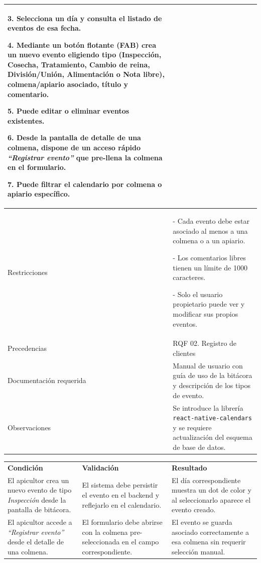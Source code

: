 \begin{tabular}{|p{4.5cm}|p{11cm}|}
3. Selecciona un día y consulta el listado de eventos de esa fecha. \par
4. Mediante un botón flotante (FAB) crea un nuevo evento eligiendo tipo (Inspección, Cosecha, Tratamiento, Cambio de reina, División/Unión, Alimentación o Nota libre), colmena/apiario asociado, título y comentario. \par
5. Puede editar o eliminar eventos existentes. \par
6. Desde la pantalla de detalle de una colmena, dispone de un acceso rápido \textit{``Registrar evento''} que pre-llena la colmena en el formulario. \par
7. Puede filtrar el calendario por colmena o apiario específico. \\
\hline
Restricciones &
- Cada evento debe estar asociado al menos a una colmena o a un apiario. \par
- Los comentarios libres tienen un límite de 1000 caracteres. \par
- Solo el usuario propietario puede ver y modificar sus propios eventos. \\
\hline
Precedencias & RQF 02. Registro de clientes \\ \hline
Documentación requerida & Manual de usuario con guía de uso de la bitácora y descripción de los tipos de evento. \\ \hline
Observaciones & Se introduce la librería \texttt{react-native-calendars} y se requiere actualización del esquema de base de datos. \\ \hline
\end{tabular}

\vspace{0.3cm}

\noindent
\begin{tabular}{|p{5.1cm}|p{5.1cm}|p{5.1cm}|}
\hline
\rowcolor{secVerde}\multicolumn{3}{|l|}{\color{white}\textbf{4. CONDICIONES DE PRUEBA}} \\
\hline
\rowcolor{cellGris}\textbf{Condición} & \textbf{Validación} & \textbf{Resultado} \\
\hline
El apicultor crea un nuevo evento de tipo \textit{Inspección} desde la pantalla de bitácora. &
El sistema debe persistir el evento en el backend y reflejarlo en el calendario. &
El día correspondiente muestra un dot de color y al seleccionarlo aparece el evento creado. \\
\hline
El apicultor accede a \textit{``Registrar evento''} desde el detalle de una colmena. &
El formulario debe abrirse con la colmena pre-seleccionada en el campo correspondiente. &
El evento se guarda asociado correctamente a esa colmena sin requerir selección manual. \\
\hline
\end{tabular}
